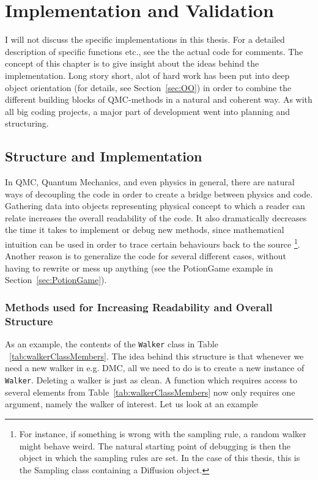 \chapter{Implementation and Validation}

I will not discuss the specific implementations in this thesis. For a detailed description of specific functions etc., see the the actual code for comments. The concept of this chapter is to give insight about the ideas behind the implementation.  Long story short, alot of hard work has been put into deep object orientation (for details, see Section~\ref{sec:OO}) in order to combine the different building blocks of QMC-methods in a natural and coherent way. As with all big coding projects, a major part of development went into planning and structuring.

\section{Structure and Implementation}
\label{sec:StructureandImplementation}

In QMC, Quantum Mechanics, and even physics in general, there are natural ways of decoupling the code in order to create a bridge between physics and code. Gathering data into objects representing physical concept to which a reader can relate increases the overall readability of the code. It also dramatically decreases the time it takes to implement or debug new methods, since mathematical intuition can be used in order to trace certain behaviours back to the source \footnote{For instance, if something is wrong with the sampling rule, a random walker might behave weird. The natural starting point of debugging is then the object in which the sampling rules are set. In the case of this thesis, this is the Sampling class containing a Diffusion object.}. Another reason is to generalize the code for several different cases, without having to rewrite or mess up anything (see the PotionGame example in Section~\ref{sec:PotionGame}).

\subsection{Methods used for Increasing Readability and Overall Structure}


As an example, the contents of the \verb+Walker+ class in Table ~\ref{tab:walkerClassMembers}. The idea behind this structure is that whenever we need a new walker in e.g. DMC, all we need to do is to create a new instance of \verb+Walker+. Deleting a walker is just as clean. A function which requires access to several elements from Table~\ref{tab:walkerClassMembers} now only requires one argument, namely the walker of interest. Let us look at an example


